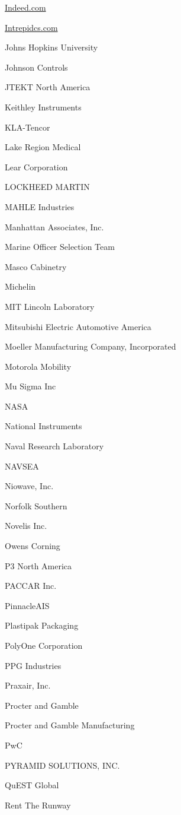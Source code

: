 \documentclass[twoside]{article}
\begin{document}
\begin{center}
\begin{multicols}{5}
\begin{FlushLeft}
\begin{compactitem}
\item \url{Indeed.com}
\item \url{Intrepidcs.com}
\item Johns Hopkins University
\item Johnson Controls
\item JTEKT North America
\item Keithley Instruments
\item KLA-Tencor
\item Lake Region Medical
\item Lear Corporation
\item LOCKHEED MARTIN
\item MAHLE Industries
\item Manhattan Associates, Inc.
\item Marine Officer Selection Team
\item Masco Cabinetry
\item Michelin
\item MIT Lincoln Laboratory
\item Mitsubishi Electric Automotive America
\item Moeller Manufacturing Company, Incorporated
\item Motorola Mobility
\item Mu Sigma Inc
\item NASA
\item National Instruments
\item Naval Research Laboratory
\item NAVSEA
\item Niowave, Inc.
\item Norfolk Southern
\item Novelis Inc.
\item Owens Corning
\item P3 North America
\item PACCAR Inc.
\item PinnacleAIS
\item Plastipak Packaging
\item PolyOne Corporation
\item PPG Industries
\item Praxair, Inc.
\item Procter and Gamble
\item Procter and Gamble Manufacturing
\item PwC
\item PYRAMID SOLUTIONS, INC.
\item QuEST Global
\item Rent The Runway

\end{compactitem}
\end{FlushLeft}
\end{multicols}
\end{center}
\end{document}
